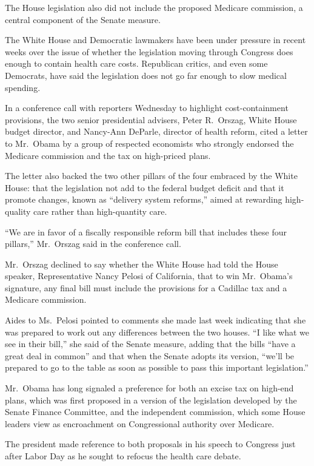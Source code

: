 ﻿\documentclass[12pt]{article}
\begin{document}
The House legislation also did not include the proposed Medicare commission, a central component of
the Senate measure.

The White House and Democratic lawmakers have been under pressure in recent weeks over the issue of
whether the legislation moving through Congress does enough to contain health care costs. Republican
critics, and even some Democrats, have said the legislation does not go far enough to slow medical
spending.

In a conference call with reporters Wednesday to highlight cost-containment provisions, the two
senior presidential advisers, Peter R.~Orszag, White House budget director, and Nancy-Ann DeParle,
director of health reform, cited a letter to Mr.~Obama by a group of respected economists who
strongly endorsed the Medicare commission and the tax on high-priced plans.

The letter also backed the two other pillars of the four embraced by the White House: that the
legislation not add to the federal budget deficit and that it promote changes, known as ``delivery
system reforms,'' aimed at rewarding high-quality care rather than high-quantity care.

``We are in favor of a fiscally responsible reform bill that includes these four pillars,''
Mr.~Orszag said in the conference call.

Mr.~Orszag declined to say whether the White House had told the House speaker, Representative Nancy
Pelosi of California, that to win Mr.~Obama's signature, any final bill must include the provisions
for a Cadillac tax and a Medicare commission.

Aides to Ms.~Pelosi pointed to comments she made last week indicating that she was prepared to work
out any differences between the two houses. ``I like what we see in their bill,'' she said of the
Senate measure, adding that the bills ``have a great deal in common'' and that when the Senate
adopts its version, ``we'll be prepared to go to the table as soon as possible to pass this
important legislation.''

Mr.~Obama has long signaled a preference for both an excise tax on high-end plans, which was first
proposed in a version of the legislation developed by the Senate Finance Committee, and the
independent commission, which some House leaders view as encroachment on Congressional authority
over Medicare.

The president made reference to both proposals in his speech to Congress just after Labor Day as he
sought to refocus the health care debate.
\end{document}
